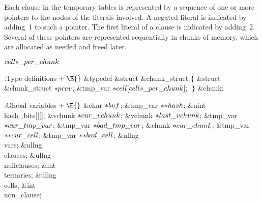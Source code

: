 Each clause in the temporary tables is represented by a sequence of
one or more pointers to the  nodes of the literals involved.
A negated literal is indicated by adding~1 to such a pointer.
The first literal of a clause is indicated by adding~2.
Several of these pointers are represented sequentially in chunks
of memory, which are allocated as needed and freed later.

\Y\B\4\D$\\{cells\_per\_chunk}$ \5
\par
\Y\B\4:Type definitions\X${}\mathrel+\E{}$\6
\&{typedef} \&{struct} \&{chunk\_struct} ${}\{{}$\1\6
\&{struct} \&{chunk\_struct} ${}{*}\\{prev}{}$;\6
\&{tmp\_var} ${}{*}\\{cell}[\\{cells\_per\_chunk}];{}$\2\6
${}\}{}$ \&{chunk};\par
\fi

\B{}:Global variables\X${}\mathrel+\E{}$\6
\&{char} ${}{*}\\{buf}{}$;\6
\&{tmp\_var} ${}{*}{*}\\{hash}{}$;\6
\&{uint} \\{hash\_bits}[][];\6
\&{vchunk} ${}{*}\\{cur\_vchunk}{}$;\6
\&{vchunk} ${}{*}\\{last\_vchunk}{}$;\6
\&{tmp\_var} ${}{*}\\{cur\_tmp\_var}{}$;\6
\&{tmp\_var} ${}{*}\\{bad\_tmp\_var}{}$;\6
\&{chunk} ${}{*}\\{cur\_chunk}{}$;\6
\&{tmp\_var} ${}{*}{*}\\{cur\_cell}{}$;\6
\&{tmp\_var} ${}{*}{*}\\{bad\_cell}{}$;\6
\&{ullng} \\{vars};\6
\&{ullng} \\{clauses};\6
\&{ullng} \\{nullclauses};\6
\&{int} \\{ternaries};\6
\&{ullng} \\{cells};\6
\&{int} \\{non\_clause};\par
\fi

